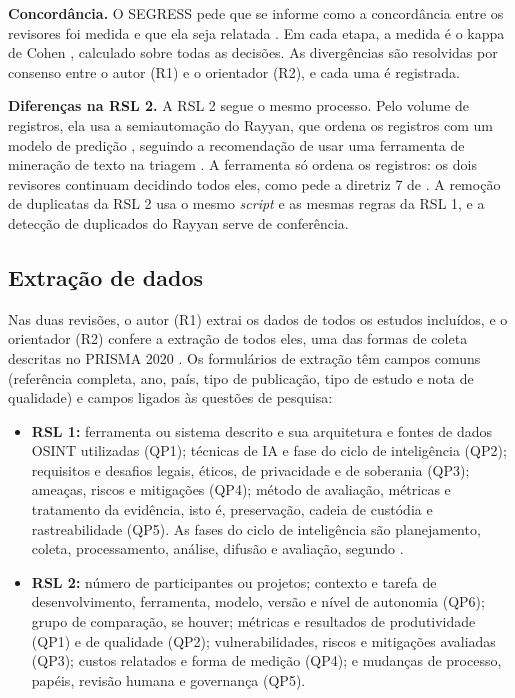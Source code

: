\textbf{Concordância.} O SEGRESS pede que se informe como a concordância entre
os revisores foi medida e que ela seja relatada \cite[itens 8 e
16a]{kitchenham2023segress}. Em cada etapa, a medida é o kappa de Cohen
\cite{cohen1960}, calculado sobre todas as decisões. As divergências são
resolvidas por consenso entre o autor (R1) e o orientador (R2), e cada uma é
registrada.

\textbf{Diferenças na RSL 2.} A RSL 2 segue o mesmo processo. Pelo volume de
registros, ela usa a semiautomação do Rayyan, que ordena os registros com um
modelo de predição \cite{ouzzani2016}, seguindo a recomendação de usar uma
ferramenta de mineração de texto na triagem \cite[diretriz 6]{polanin2019}. A
ferramenta só ordena os registros: os dois revisores continuam decidindo todos
eles, como pede a diretriz 7 de .
A remoção de duplicatas da RSL 2 usa o mesmo \textit{script} e as mesmas
regras da RSL 1, e a detecção de duplicados do Rayyan serve de conferência.





\subsection{Extração de dados}

Nas duas revisões, o autor (R1) extrai os dados de todos os estudos incluídos,
e o orientador (R2) confere a extração de todos eles, uma das formas de coleta
descritas no PRISMA 2020 \cite[item 9]{page2021ee}. Os formulários de extração
têm campos comuns (referência completa, ano, país, tipo de publicação, tipo de
estudo e nota de qualidade) e campos ligados às questões de pesquisa:

\begin{itemize}
	\item \textbf{RSL 1:} ferramenta ou sistema descrito e sua arquitetura e
	fontes de dados OSINT utilizadas (QP1); técnicas de IA e fase do ciclo de
	inteligência (QP2); requisitos e desafios legais, éticos, de privacidade e
	de soberania (QP3); ameaças, riscos e mitigações (QP4); método de
	avaliação, métricas e tratamento da evidência, isto é, preservação, cadeia
	de custódia e rastreabilidade (QP5). As fases do ciclo de inteligência são
	planejamento, coleta, processamento, análise, difusão e avaliação,
	segundo .
	\item \textbf{RSL 2:} número de participantes ou projetos; contexto e
	tarefa de desenvolvimento, ferramenta, modelo, versão e nível de autonomia
	(QP6); grupo de comparação, se houver; métricas e resultados de
	produtividade (QP1) e de qualidade (QP2); vulnerabilidades, riscos e
	mitigações avaliadas (QP3); custos relatados e forma de medição (QP4); e
	mudanças de processo, papéis, revisão humana e governança (QP5).
\end{itemize}

